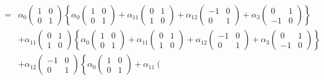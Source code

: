 \documentclass[aps,preprint]{revtex4}
\begin{document}
\begin{eqnarray}
&=&\alpha _{0}\left( 
\begin{array}{cc}
1 & 0 \\ 
0 & 1%
\end{array}%
\right) \left\{ \alpha _{0}\left( 
\begin{array}{cc}
1 & 0 \\ 
0 & 1%
\end{array}%
\right) +\alpha _{11}\left( 
\begin{array}{cc}
0 & 1 \\ 
1 & 0%
\end{array}%
\right) +\alpha _{12}\left( 
\begin{array}{cc}
-1 & 0 \\ 
0 & 1%
\end{array}%
\right) +\alpha _{3}\left( 
\begin{array}{cc}
0 & 1 \\ 
-1 & 0%
\end{array}%
\right) \right\} \\
&&+\alpha _{11}\left( 
\begin{array}{cc}
0 & 1 \\ 
1 & 0%
\end{array}%
\right) \left\{ \alpha _{0}\left( 
\begin{array}{cc}
1 & 0 \\ 
0 & 1%
\end{array}%
\right) +\alpha _{11}\left( 
\begin{array}{cc}
0 & 1 \\ 
1 & 0%
\end{array}%
\right) +\alpha _{12}\left( 
\begin{array}{cc}
-1 & 0 \\ 
0 & 1%
\end{array}%
\right) +\alpha _{3}\left( 
\begin{array}{cc}
0 & 1 \\ 
-1 & 0%
\end{array}%
\right) \right\} \\
&&+\alpha _{12}\left( 
\begin{array}{cc}
-1 & 0 \\ 
0 & 1%
\end{array}%
\right) \left\{ \alpha _{0}\left( 
\begin{array}{cc}
1 & 0 \\ 
0 & 1%
\end{array}%
\right) +\alpha _{11}\left( 
\begin{array}{cc}

\end{array}
\end{eqnarray}
\end{document}
